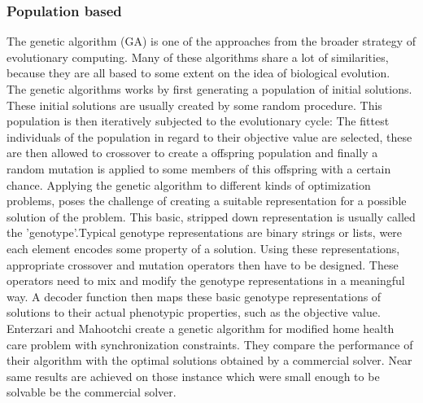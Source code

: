 \subsubsection{Population based}

The genetic algorithm (GA) is one of the approaches from the broader strategy of evolutionary computing. Many of these algorithms share a lot of similarities, because they are all based to some extent on the idea of biological evolution.\\ %
The genetic algorithms works by first generating a population of initial solutions. These initial solutions are usually created by some random procedure. This population is then iteratively subjected to the evolutionary cycle: The fittest individuals of the population in regard to their objective value are selected, these are then allowed to crossover to create a offspring population and finally a random mutation is applied to some members of this offspring with a certain chance. Applying the genetic algorithm to different kinds of optimization problems, poses the challenge of creating a suitable representation for a possible solution of the problem. This basic, stripped down representation is usually called the 'genotype'.Typical genotype representations are binary strings or lists, were each element encodes some property of a solution. Using these representations, appropriate crossover and mutation operators then have to be designed. These operators need to mix and modify the genotype representations in a meaningful way. A decoder function then maps these basic genotype representations of solutions to their actual phenotypic properties, such as the objective value.\\
Enterzari and Mahootchi \cite{entezari_developing_2020} create a genetic algorithm for modified home health care problem with synchronization constraints. They compare the performance of their algorithm with the optimal solutions obtained by a commercial solver. Near same results are achieved on those instance which were small enough to be solvable be the commercial solver.\\ \\
